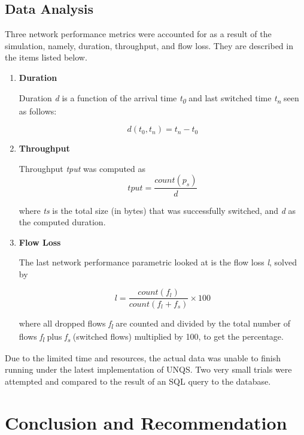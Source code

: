 \documentclass[journal]{IEEE/IEEEtran}
\begin{document}

\subsection{Data Analysis}

Three network performance metrics were accounted for as a result of the simulation, namely, duration, throughput, and flow loss. They are described in the items listed below.

\begin{enumerate}
\item \textbf{Duration}


Duration \textit{d} is a function of the arrival time \textit{t\textsubscript{0}} and last switched time \textit{t\textsubscript{n}} seen as follows:

\[
	d(t_0, t_n) = t_n - t_0
\]

\item \textbf{Throughput}

Throughput \textit{tput} was computed as 
\[
	tput = \frac{count(p_s)}{d}
\]

where \textit{ts} is the total size (in bytes) that was successfully switched, and \textit{d} as the computed duration. 

\item \textbf{Flow Loss}

The last network performance parametric looked at is the flow loss \textit{l}, solved by

\[
	l = \frac{count(f_l)}{count(f_l + f_s)} \times 100
\]

where all dropped flows \textit{f\textsubscript{l}} are counted and divided by the total number of flows \textit{f\textsubscript{l}} plus \textit{f\textsubscript{s}} (switched flows) multiplied by 100, to get the percentage. 

\end{enumerate}

Due to the limited time and resources, the actual data was unable to finish running under the latest implementation of UNQS. Two very small trials were attempted and compared to the result of an SQL query to the database.
\section{Conclusion and Recommendation}
\end{document}
